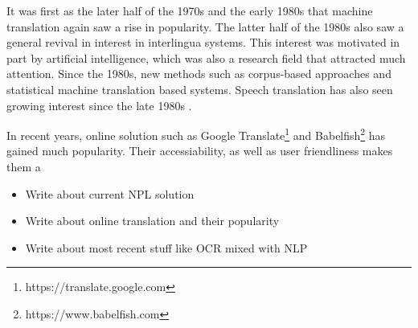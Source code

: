 It was first as the later half of the 1970s and the early 1980s that machine translation again saw a rise in popularity. The latter half of the 1980s also saw a general revival in interest in interlingua systems. This interest was motivated in part by artificial intelligence, which was also a research field that attracted much attention. Since the 1980s, new methods such as corpus-based approaches and statistical machine translation based systems. Speech translation has also seen growing interest since the late 1980s \citep{hutchins2007machine}.

In recent years, online solution such as Google Translate\footnote{https://translate.google.com} and Babelfish\footnote{https://www.babelfish.com} has gained much popularity. Their accessiability, as well as user friendliness makes them a 

\begin{itemize}
    \item Write about current NPL solution
    \item Write about online translation and their popularity
    \item Write about most recent stuff like OCR mixed with NLP
\end{itemize}